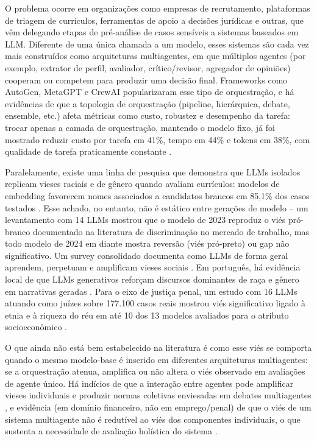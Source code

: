 \documentclass[12pt]{article}
\begin{document}
O problema ocorre em organizações como empresas de recrutamento, plataformas de triagem de currículos, ferramentas de apoio a decisões jurídicas e outras, que vêm delegando etapas de pré-análise de casos sensíveis a sistemas baseados em LLM. Diferente de uma única chamada a um modelo, esses sistemas são cada vez mais construídos como arquiteturas multiagentes, em que múltiplos agentes (por exemplo, extrator de perfil, avaliador, crítico/revisor, agregador de opiniões) cooperam ou competem para produzir uma decisão final. Frameworks como AutoGen, MetaGPT e CrewAI popularizaram esse tipo de orquestração, e há evidências de que a topologia de orquestração (pipeline, hierárquica, debate, ensemble, etc.) afeta métricas como custo, robustez e desempenho da tarefa: trocar apenas a camada de orquestração, mantendo o modelo fixo, já foi mostrado reduzir custo por tarefa em 41\%, tempo em 44\% e tokens em 38\%, com qualidade de tarefa praticamente constante \citep{sayedali2026harness}.

Paralelamente, existe uma linha de pesquisa que demonstra que LLMs isolados replicam vieses raciais e de gênero quando avaliam currículos: modelos de embedding favorecem nomes associados a candidatos brancos em 85,1\% dos casos testados \citep{wilson2024gender}. Esse achado, no entanto, não é estático entre gerações de modelo -- um levantamento com 14 LLMs \citep{gao2026hiring} mostrou que o modelo de 2023 reproduz o viés pró-branco documentado na literatura de discriminação no mercado de trabalho, mas todo modelo de 2024 em diante mostra reversão (viés pró-preto) ou gap não significativo. Um survey consolidado documenta como LLMs de forma geral aprendem, perpetuam e amplificam vieses sociais \citep{gallegos2024bias}. Em português, há evidência local de que LLMs generativos reforçam discursos dominantes de raça e gênero em narrativas geradas \citep{bonil2025yet}. Para o eixo de justiça penal, um estudo com 16 LLMs atuando como juízes sobre 177.100 casos reais mostrou viés significativo ligado à etnia e à riqueza do réu em até 10 dos 13 modelos avaliados para o atributo socioeconômico \citep{hu2025judicial}.

O que ainda não está bem estabelecido na literatura é como esse viés se comporta quando o mesmo modelo-base é inserido em diferentes arquiteturas multiagentes: se a orquestração atenua, amplifica ou não altera o viés observado em avaliações de agente único. Há indícios de que a interação entre agentes pode amplificar vieses individuais e produzir normas coletivas enviesadas em debates multiagentes \citep{okawa2026emergence}, e evidência (em domínio financeiro, não em emprego/penal) de que o viés de um sistema multiagente não é redutível ao viés dos componentes individuais, o que sustenta a necessidade de avaliação holística do sistema \citep{madigan2025emergent}.
\end{document}
